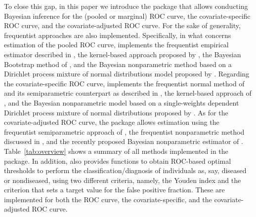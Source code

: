 To close this gap, in this paper we introduce the  package that allows conducting Bayesian inference for the (pooled or marginal) ROC curve, the covariate-specific ROC curve, and the covariate-adjusted ROC curve. For the sake of generality, frequentist approaches are also implemented. Specifically, in what concerns estimation of the pooled ROC curve,  implements the frequentist empirical estimator described in \cite{Hsieh1996}, the kernel-based approach proposed by \cite{Zou97}, the Bayesian Bootstrap method of \cite{Gu2008}, and the Bayesian nonparametric method based on a Dirichlet process mixture of normal distributions model proposed by \cite{Erkanli2006}. Regarding the covariate-specific ROC curve,  implements the frequentist normal method of \cite{Faraggi03} and its semiparametric counterpart as described in \cite{Pepe98}, the kernel-based approach of \cite{MX11a}, and the Bayesian nonparametric model based on a single-weights dependent Dirichlet process mixture of normal distributions proposed by \cite{Inacio13}. As for the covariate-adjusted ROC curve, the  package allows estimation using the frequentist semiparametric approach of \cite{Janes09a}, the frequentist nonparametric method discussed in \cite{MX11a}, and the recently proposed Bayesian nonparametric estimator of \cite{Inacio18}. Table~\ref{tab:overview} shows a summary of all methods implemented in the package. In addition,  also provides functions to obtain ROC-based optimal thresholds to perform the classification/diagnosis of individuals as, say, diseased or nondiseased, using two different criteria, namely, the Youden index and the criterion that sets a target value for the false positive fraction. These are implemented for both the ROC curve, the covariate-specific, and the covariate-adjusted ROC curve.

